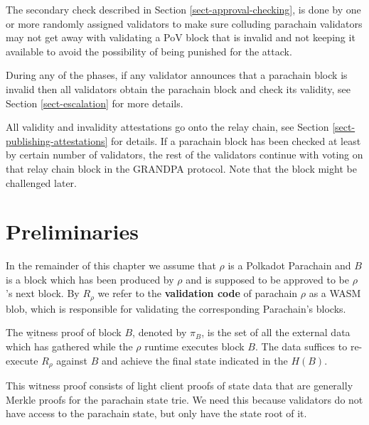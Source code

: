 The secondary check described in Section \ref{sect-approval-checking}, is done
by one or more randomly assigned validators to make sure colluding parachain
validators may not get away with validating a PoV block that is invalid and not
keeping it available to avoid the possibility of being punished for the attack.
\newline

During any of the phases, if any validator announces that a parachain block is
invalid then all validators obtain the parachain block and check its validity,
see Section \ref{sect-escalation} for more details.
\newline

All validity and invalidity attestations go onto the relay chain, see Section
\ref{sect-publishing-attestations} for details. If a parachain block has been
checked at least by certain number of validators, the rest of the validators
continue with voting on that relay chain block in the GRANDPA protocol. Note
that the block might be challenged later.
\newline

\section{Preliminaries}

\begin{definition}
In the remainder of this chapter we assume that $\rho$ is a Polkadot Parachain
and $B$ is a block which has been produced by $\rho$ and is supposed to be
approved to be $\rho$'s next block. By $R_{\rho}$ we refer to the
\textbf{validation code} of parachain $\rho$ as a WASM blob, which is
responsible for validating the corresponding Parachain's blocks.
\end{definition}

\begin{definition}
  \label{defn-witness-proof}
  The {\b witness proof} of block $B$, denoted by {\bf $\pi_B$}, is the set of
  all the external data which has gathered while the $\rho$ runtime executes
  block $B$. The data suffices to re-execute $R_{\rho}$ against $B$ and achieve
  the final state indicated in the $H(B)$.
\end{definition}

This witness proof consists of light client proofs of state data that are
generally Merkle proofs for the parachain state trie.  We need this because
validators do not have access to the parachain state, but only have the state
root of it.

